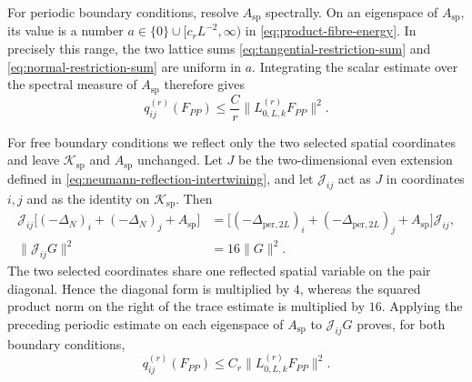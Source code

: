 \documentclass[11pt]{article}
\numberwithin{equation}{section}
\theoremstyle{remark}
\newcommand{\1}{\mathbf 1}
\begin{document}
For periodic boundary conditions, resolve \(A_{\mathrm{sp}}\) spectrally.
On an eigenspace of \(A_{\mathrm{sp}}\), its value is a number
\(a\in\{0\}\cup[c_rL^{-2},\infty)\) in
\eqref{eq:product-fibre-energy}.  In precisely this range, the two lattice sums
\eqref{eq:tangential-restriction-sum} and
\eqref{eq:normal-restriction-sum} are uniform in \(a\).  Integrating the
scalar estimate over the spectral measure of \(A_{\mathrm{sp}}\) therefore
gives
\begin{equation}
 q_{ij}^{(r)}(F_{PP})
 \leq\frac Cr\|L_{0,L,k}^{(r)}F_{PP}\|^2.
 \label{eq:decorated-PP-periodic-trace}
\end{equation}

For free boundary conditions we reflect only the two selected spatial
coordinates and leave \(\mathcal K_{\mathrm{sp}}\) and \(A_{\mathrm{sp}}\) unchanged.
Let \(J\) be the two-dimensional even extension defined in
\eqref{eq:neumann-reflection-intertwining}, and let
\(\mathcal J_{ij}\) act as \(J\) in coordinates \(i,j\) and as the
identity on \(\mathcal K_{\mathrm{sp}}\).  Then
\begin{align}
 \mathcal J_{ij}
 \bigl[(-\Delta_N)_i+(-\Delta_N)_j+A_{\mathrm{sp}}\bigr]
 &=\bigl[(-\Delta_{\mathrm{per},2L})_i
 +(-\Delta_{\mathrm{per},2L})_j+A_{\mathrm{sp}}\bigr]\mathcal J_{ij},
 \label{eq:decorated-PP-reflection-intertwining}\\
 \|\mathcal J_{ij}G\|^2&=16\|G\|^2.
 \label{eq:decorated-PP-reflection-norm}
\end{align}
The two selected coordinates share one reflected spatial variable on the
pair diagonal.  Hence the diagonal form is multiplied by \(4\), whereas
the squared product norm on the right of the trace estimate is multiplied
by \(16\).  Applying the preceding periodic estimate on each eigenspace
of \(A_{\mathrm{sp}}\) to \(\mathcal J_{ij}G\) proves, for both boundary
conditions,
\begin{equation}
 q_{ij}^{(r)}(F_{PP})
 \leq C_r\|L_{0,L,k}^{(r)}F_{PP}\|^2.
 \label{eq:decorated-PP-trace}
\end{equation}
\end{document}
